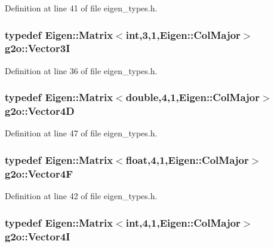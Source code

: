 Definition at line 41 of file eigen\+\_\+types.\+h.

\subsubsection[{\texorpdfstring{Vector3I}{Vector3I}}]{\setlength{\rightskip}{0pt plus 5cm}typedef Eigen\+::\+Matrix$<$int,3,1,Eigen\+::\+Col\+Major$>$ {\bf g2o\+::\+Vector3I}}\hypertarget{namespaceg2o_a501b6f80eef8d521f6fd1a31e8413f3a}{}\label{namespaceg2o_a501b6f80eef8d521f6fd1a31e8413f3a}


Definition at line 36 of file eigen\+\_\+types.\+h.

\subsubsection[{\texorpdfstring{Vector4D}{Vector4D}}]{\setlength{\rightskip}{0pt plus 5cm}typedef Eigen\+::\+Matrix$<$double,4,1,Eigen\+::\+Col\+Major$>$ {\bf g2o\+::\+Vector4D}}\hypertarget{namespaceg2o_afd9c8c912186d1f96141027c854fce42}{}\label{namespaceg2o_afd9c8c912186d1f96141027c854fce42}


Definition at line 47 of file eigen\+\_\+types.\+h.

\subsubsection[{\texorpdfstring{Vector4F}{Vector4F}}]{\setlength{\rightskip}{0pt plus 5cm}typedef Eigen\+::\+Matrix$<$float,4,1,Eigen\+::\+Col\+Major$>$ {\bf g2o\+::\+Vector4F}}\hypertarget{namespaceg2o_aebecb51a41734608aeea377a31ee88c6}{}\label{namespaceg2o_aebecb51a41734608aeea377a31ee88c6}


Definition at line 42 of file eigen\+\_\+types.\+h.

\subsubsection[{\texorpdfstring{Vector4I}{Vector4I}}]{\setlength{\rightskip}{0pt plus 5cm}typedef Eigen\+::\+Matrix$<$int,4,1,Eigen\+::\+Col\+Major$>$ {\bf g2o\+::\+Vector4I}}\hypertarget{namespaceg2o_a7a368c33c15d52cca214b779a5fb32ce}{}\label{namespaceg2o_a7a368c33c15d52cca214b779a5fb32ce}


